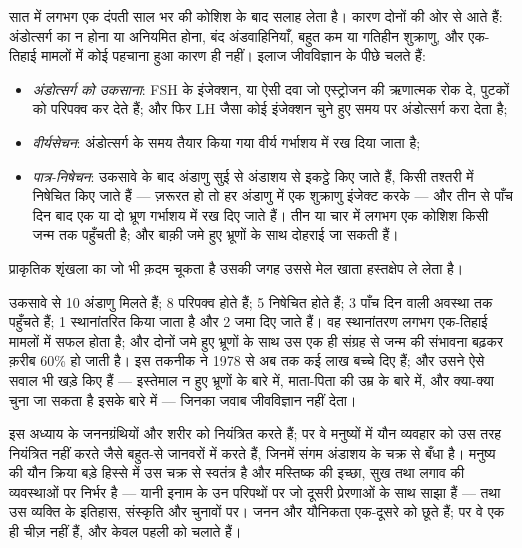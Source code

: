 \begin{proposition}[जब गर्भ नहीं ठहरता]\label{prop:g11:hormones-and-reproduction:art}
सात में लगभग एक दंपती साल भर की कोशिश के बाद सलाह लेता है। कारण दोनों की
ओर से आते हैं: अंडोत्सर्ग का न होना या अनियमित होना, बंद अंडवाहिनियाँ, बहुत
कम या गतिहीन शुक्राणु, और एक-तिहाई मामलों में कोई पहचाना हुआ कारण ही नहीं।
इलाज जीवविज्ञान के पीछे चलते हैं:
\begin{itemize}
  \item \emph{अंडोत्सर्ग को उकसाना}: FSH के इंजेक्शन, या ऐसी दवा जो
        एस्ट्रोजन की ऋणात्मक  रोक दे, पुटकों को परिपक्व कर देते
        हैं; और फिर LH जैसा कोई इंजेक्शन चुने हुए समय पर अंडोत्सर्ग करा
        देता है;
  \item \emph{वीर्यसेचन}: अंडोत्सर्ग के समय तैयार किया गया वीर्य गर्भाशय
        में रख दिया जाता है;
  \item \emph{पात्र-निषेचन}: उकसावे के बाद अंडाणु सुई से अंडाशय से इकट्ठे
        किए जाते हैं, किसी तश्तरी में निषेचित किए जाते हैं --- ज़रूरत हो
        तो हर अंडाणु में एक शुक्राणु इंजेक्ट करके --- और तीन से पाँच दिन
        बाद एक या दो भ्रूण गर्भाशय में रख दिए जाते हैं। तीन या चार में
        लगभग एक कोशिश किसी जन्म तक पहुँचती है; और बाक़ी जमे हुए भ्रूणों
        के साथ दोहराई जा सकती हैं।
\end{itemize}
प्राकृतिक शृंखला का जो भी क़दम चूकता है उसकी जगह उससे मेल खाता हस्तक्षेप ले
लेता है।
\end{proposition}
\admitted

\begin{example}[एक कोशिश के अंक]\label{ex:g11:hormones-and-reproduction:ivf}
उकसावे से 10 अंडाणु मिलते हैं; 8 परिपक्व होते हैं; 5 निषेचित होते हैं; 3
पाँच दिन वाली अवस्था तक पहुँचते हैं; 1 स्थानांतरित किया जाता है और 2 जमा
दिए जाते हैं। वह स्थानांतरण लगभग एक-तिहाई मामलों में सफल होता है; और दोनों
जमे हुए भ्रूणों के साथ उस एक ही संग्रह से जन्म की संभावना बढ़कर क़रीब 60\%
हो जाती है। इस तकनीक ने 1978 से अब तक कई लाख बच्चे दिए हैं; और उसने ऐसे
सवाल भी खड़े किए हैं --- इस्तेमाल न हुए भ्रूणों के बारे में, माता-पिता की
उम्र के बारे में, और क्या-क्या चुना जा सकता है इसके बारे में --- जिनका
जवाब जीवविज्ञान नहीं देता।
\end{example}

\begin{remark}[दो व्यवस्थाएँ जो मिलती हैं]\label{rem:g11:hormones-and-reproduction:brain}
इस अध्याय के  जननग्रंथियों और शरीर को नियंत्रित करते हैं; पर वे
मनुष्यों में यौन व्यवहार को उस तरह नियंत्रित नहीं करते जैसे बहुत-से जानवरों
में करते हैं, जिनमें संगम अंडाशय के चक्र से बँधा है। मनुष्य की यौन क्रिया
बड़े हिस्से में उस चक्र से स्वतंत्र है और मस्तिष्क की इच्छा, सुख तथा लगाव
की व्यवस्थाओं पर निर्भर है --- यानी इनाम के उन परिपथों पर जो दूसरी
प्रेरणाओं के साथ साझा हैं --- तथा उस व्यक्ति के इतिहास, संस्कृति और चुनावों
पर। जनन और यौनिकता एक-दूसरे को छूते हैं; पर वे एक ही चीज़ नहीं हैं, और
 केवल पहली को चलाते हैं।
\end{remark}

